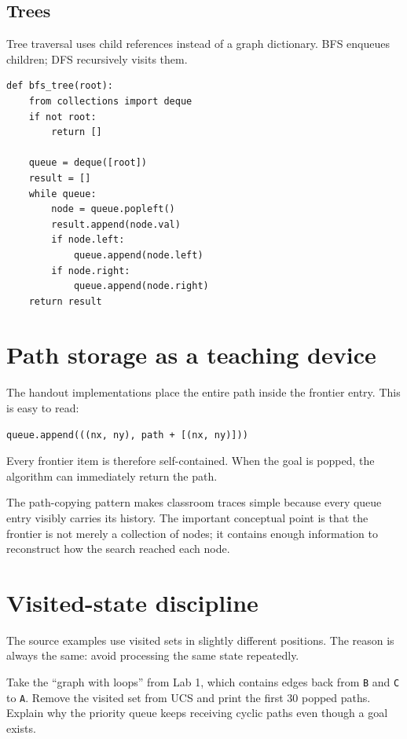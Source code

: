 \subsection{Trees}
Tree traversal uses child references instead of a graph dictionary. BFS enqueues children; DFS recursively visits them.

\begin{lstlisting}[style=mlpython]
def bfs_tree(root):
    from collections import deque
    if not root:
        return []

    queue = deque([root])
    result = []
    while queue:
        node = queue.popleft()
        result.append(node.val)
        if node.left:
            queue.append(node.left)
        if node.right:
            queue.append(node.right)
    return result
\end{lstlisting}

\section{Path storage as a teaching device}

The handout implementations place the entire path inside the frontier entry. This is easy to read:

\begin{lstlisting}[style=mlpython]
queue.append(((nx, ny), path + [(nx, ny)]))
\end{lstlisting}

Every frontier item is therefore self-contained. When the goal is popped, the algorithm can immediately return the path.

\begin{intuition}
The path-copying pattern makes classroom traces simple because every queue entry visibly carries its history. The important conceptual point is that the frontier is not merely a collection of nodes; it contains enough information to reconstruct how the search reached each node.
\end{intuition}

\section{Visited-state discipline}

The source examples use visited sets in slightly different positions. The reason is always the same: avoid processing the same state repeatedly.

\begin{debugtask}
Take the ``graph with loops'' from Lab 1, which contains edges back from \texttt{B} and \texttt{C} to \texttt{A}. Remove the visited set from UCS and print the first 30 popped paths. Explain why the priority queue keeps receiving cyclic paths even though a goal exists.
\end{debugtask}

